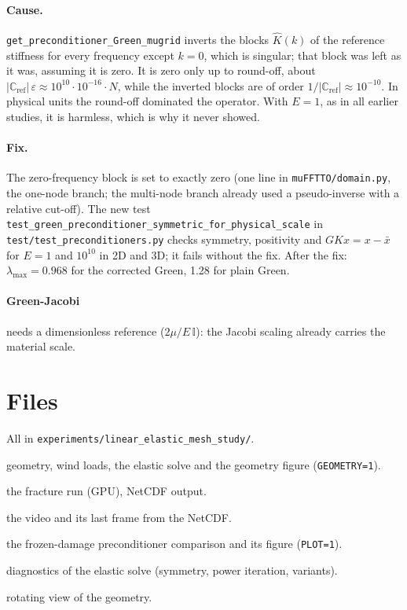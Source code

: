 \documentclass[11pt,a4paper]{article}
\begin{document}
\paragraph{Cause.} \texttt{get\_preconditioner\_Green\_mugrid} inverts the blocks $\hat K(k)$ of the reference stiffness
for every frequency except $k = 0$, which is singular; that block was left as it was, assuming it is zero. It is zero
only up to round-off, about $|\mathbb{C}_{\mathrm{ref}}|\,\varepsilon \approx 10^{10}\cdot 10^{-16}\cdot N$, while the
inverted blocks are of order $1/|\mathbb{C}_{\mathrm{ref}}| \approx 10^{-10}$. In physical units the round-off dominated
the operator. With $E = 1$, as in all earlier studies, it is harmless, which is why it never showed.

\paragraph{Fix.} The zero-frequency block is set to exactly zero (one line in \texttt{muFFTTO/domain.py}, the one-node
branch; the multi-node branch already used a pseudo-inverse with a relative cut-off). The new test
\texttt{test\_green\_preconditioner\_symmetric\_for\_physical\_scale} in \texttt{test/test\_preconditioners.py} checks
symmetry, positivity and $G K x = x - \bar x$ for $E = 1$ and $10^{10}$ in 2D and 3D; it fails without the fix.
After the fix: $\lambda_{\max} = 0.968$ for the corrected Green, 1.28 for plain Green.

\paragraph{Green-Jacobi} needs a dimensionless reference ($2\mu/E\,\mathbb{I}$): the Jacobi scaling already carries the
material scale.

\section*{Files}
All in \texttt{experiments/linear\_elastic\_mesh\_study/}.
{\raggedright
\begin{description}[font=\ttfamily\small,style=nextline]
  \item[house\_wind\_3D.py] geometry, wind loads, the elastic solve and the geometry figure (\texttt{GEOMETRY=1}).
  \item[house\_damage\_3D.py] the fracture run (GPU), NetCDF output.
  \item[house\_damage\_video.py] the video and its last frame from the NetCDF.
  \item[house\_precond\_study.py] the frozen-damage preconditioner comparison and its figure (\texttt{PLOT=1}).
  \item[house\_elastic\_diag.py] diagnostics of the elastic solve (symmetry, power iteration, variants).
  \item[house\_geometry\_video.py] rotating view of the geometry.
\end{description}
}
\end{document}
